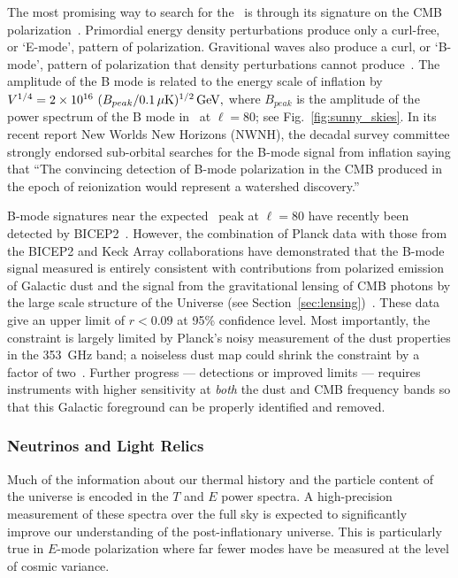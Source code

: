 The most promising way to search for the \igb\ is through its signature on the CMB polarization~\cite{kamionkowski97b,seljak97}.  
Primordial energy density perturbations produce only a curl-free, or `E-mode', pattern of polarization.
Gravitional waves also produce a curl, or `B-mode', pattern of polarization that density perturbations cannot
produce~\cite{kamionkowski97a,zaldarriaga97}.  The amplitude of the B mode is related to the energy scale
of inflation by $V^{1/4}=2\times10^{16} \ ( B_{peak} / 0.1\,\mu{\rm
K})^{1/2} \,{\rm GeV},$ where $B_{peak}$ is the amplitude of the power spectrum of the B mode in \microk\ at $\ell=80$;
see Fig.~\ref{fig:sunny_skies}. In its recent report New Worlds New Horizons (NWNH), the decadal survey 
committee strongly endorsed sub-orbital searches for the B-mode signal from 
inflation saying that ``The convincing detection of B-mode polarization in the CMB produced in the 
epoch of reionization would represent a watershed discovery.''~\cite{blandford2010}

B-mode signatures near the expected \igb\ peak at $\ell=80$ have recently been detected by BICEP2~\cite{bicep2Bmode}. 
However, the combination of Planck data with those from the BICEP2 and Keck Array collaborations have demonstrated 
that the B-mode signal measured is entirely consistent with contributions from polarized emission of Galactic dust and the 
signal from the gravitational lensing of CMB photons by the large scale structure of the Universe (see 
Section~\ref{sec:lensing})~\cite{bkp2015,planck2014-XXX,2016PhRvL.116c1302B}. 
These data give an upper limit of $r<0.09$ at 95\% confidence level.
Most importantly, the constraint is largely limited by Planck's noisy measurement of the dust properties in the 353~GHz band; 
a noiseless dust map could shrink the constraint by a factor of two~\cite{bkp2015}. 
Further progress --- detections or improved limits --- requires instruments 
with higher sensitivity at {\it both} the dust and CMB frequency bands so that this Galactic foreground can be properly identified 
and removed. 

\vspace{-0.15in}

\subsubsection{Neutrinos and Light Relics}

\vspace{-0.05in}

Much of the information about our thermal history and the particle content of the universe is encoded in the $T$ and $E$ power spectra.  
A high-precision measurement of these spectra over the full sky is expected to significantly improve our understanding of the post-inflationary 
universe.  This is particularly true in $E$-mode polarization where far fewer modes have be measured at the level of cosmic variance.   

